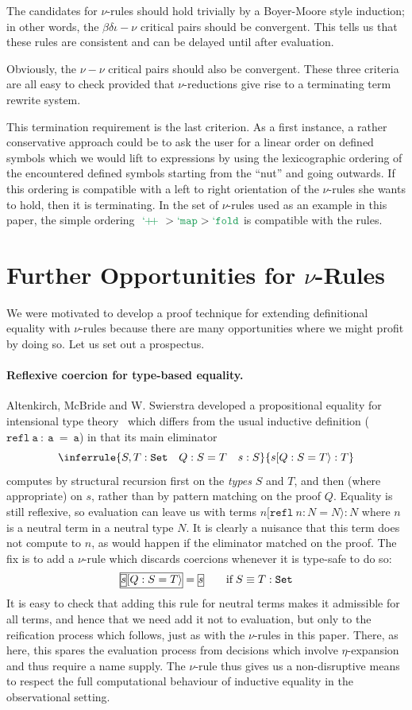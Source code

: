 \documentclass[preprint]{sigplanconf}
\begin{document}
The candidates for $\nu$-rules should hold trivially by a Boyer-Moore style
induction; in other words, the $\beta\delta\iota-\nu$ critical pairs should be
convergent. This tells us that these rules are consistent and can be delayed
until after evaluation.

Obviously, the $\nu-\nu$ critical pairs should also be convergent. These three
criteria are all easy to check provided that $\nu$-reductions give rise to a
terminating term rewrite system.

This termination requirement is the last criterion. As a first instance, a
rather conservative approach could be to ask the user for a linear order on
defined symbols which we would lift to expressions by using the lexicographic
ordering of the encountered defined symbols starting from the ``nut'' and going
outwards. If this ordering is compatible with a left to right orientation of
the $\nu$-rules she wants to hold, then it is terminating. In the set of
$\nu$-rules used as an example in this paper, the simple ordering
$\teappend > \temap > \tefold$ is compatible with the rules.


\section{Further Opportunities for $\nu$-Rules}
\label{further-opportunities}

We were motivated to develop a proof technique for extending
definitional equality with $\nu$-rules because there are many
opportunities where we might profit by doing so. Let us set out a
prospectus.

\paragraph{Reflexive coercion for type-based equality.} Altenkirch,
McBride and W. Swierstra developed a propositional equality for
intensional type theory~\cite{ObsEq} which differs from the usual inductive
definition ($\mathtt{refl~a~:~a~=~a}$) in that its main eliminator
\[
\inferrule{S,T : \mathtt{Set}\quad Q : S = T\quad s : S}
          {s[Q:S=T\rangle : T}
\]
computes by structural recursion first on the \emph{types}
$S$ and $T$, and then (where appropriate) on $s$, rather than
by pattern matching on the proof $Q$. Equality is still
reflexive, so evaluation can leave us with terms
$n[\mathtt{refl}\:n:N=N\rangle : N$
where $n$ is a neutral term in a neutral type $N$. It is clearly
a nuisance that this term does not compute to $n$, as would happen
if the eliminator matched on the proof. The fix is to add a
$\nu$-rule which discards coercions whenever it is type-safe to do so:
\[
  \fbb{\fba{$s$}$[Q:S=T\rangle$} = \fba{$s$}\qquad \mbox{if}\;S\equiv T:\mathtt{Set}
\]
It is easy to check that adding this rule for neutral terms makes it
admissible for all terms, and hence that we need add it not to
evaluation, but only to the reification process which follows, just
as with the $\nu$-rules in this paper. There, as here, this spares
the evaluation process from decisions which involve $\eta$-expansion
and thus require a name supply. The $\nu$-rule thus gives us a non-disruptive
means to respect the full computational behaviour of inductive equality
in the observational setting.
\end{document}
